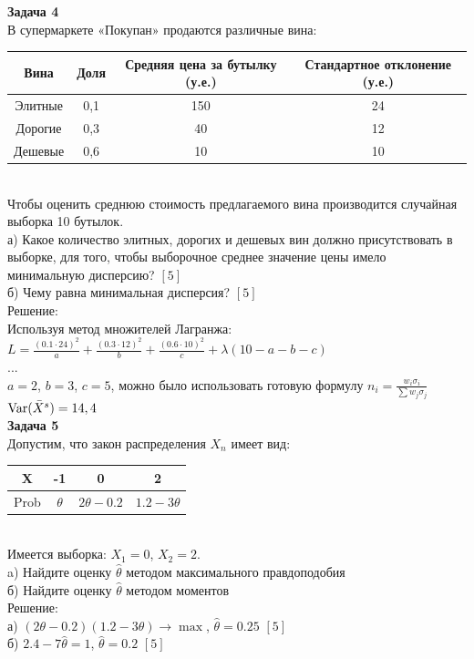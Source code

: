 \documentclass[12pt, a4paper]{article}\usepackage[]{graphicx}\usepackage[]{color}
\begin{document}
	\textbf{Задача 4} \\ %
	В супермаркете «Покупан» продаются различные вина: \\
	\begin{tabular}{|c|c|c|c|}
		\hline
		Вина & Доля & Средняя цена за бутылку (у.е.) & Стандартное отклонение (у.е.) \\
		\hline
		Элитные & 0,1 & 150 & 24 \\
		Дорогие & 0,3 & 40 & 12 \\
		Дешевые & 0,6 & 10 & 10 \\
		\hline
	\end{tabular} \\
	Чтобы оценить среднюю стоимость предлагаемого вина производится
	случайная выборка 10 бутылок. \\
	а) Какое количество элитных, дорогих и дешевых вин должно
	присутствовать в выборке, для того, чтобы выборочное среднее
	значение цены имело минимальную дисперсию? $[5]$ \\
	б) Чему равна минимальная дисперсия? $[5]$ \\
	Решение: \\
	Используя метод множителей Лагранжа: \\
	$L=\frac{(0.1\cdot 24)^{2}}{a}+\frac{(0.3\cdot
		12)^{2}}{b}+\frac{(0.6\cdot 10)^{2}}{c}+\lambda(10-a-b-c)$\\
	... \\
	$a=2$, $b=3$, $c=5$, можно было использовать готовую формулу
	$n_{i}=\frac{w_{i}\sigma_{i}}{\sum w_{j}\sigma_{j}}$ \\
	$\operatorname{Var}(\bar{X}^{s})=14,4$ \\



	\textbf{Задача 5} \\ %
	Допустим, что закон распределения $X_{n}$ имеет вид: \\
	\begin{tabular}{|c|c|c|c|}
		\hline
		X & -1 & 0 & 2 \\
		\hline
		Prob & $\theta$ & $2\theta-0.2$ & $1.2-3\theta$ \\
		\hline
	\end{tabular} \\
	Имеется выборка: $X_{1}=0$, $X_{2}=2$. \\
	a) Найдите оценку $\hat{\theta}$ методом максимального правдоподобия \\
	б) Найдите оценку $\hat{\theta}$ методом моментов \\
	Решение: \\
	а) $(2\theta-0.2)(1.2-3\theta)\rightarrow\max$,
	$\hat{\theta}=0.25$ $[5]$\\
	б) $2.4-7\hat{\theta}=1$, $\hat{\theta}=0.2$ $[5]$\\
\end{document}

